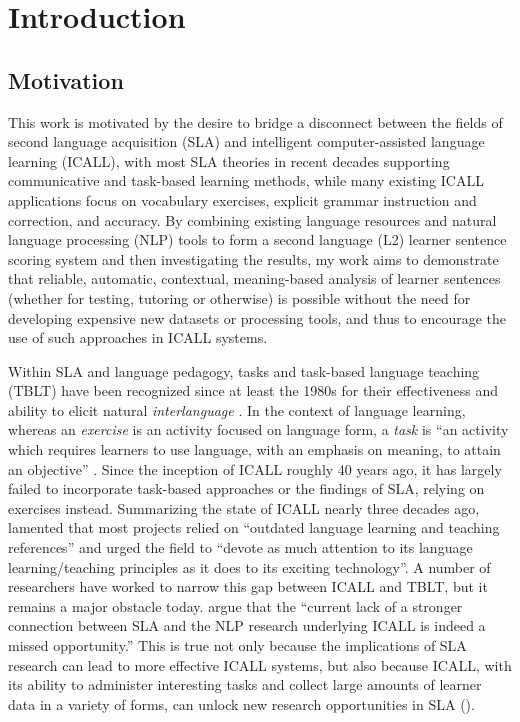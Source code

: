 \chapter{Introduction}
\label{chap:intro}

\section{Motivation}
\label{sec:motivation}


This work is motivated by the desire to bridge a disconnect between the fields of second language acquisition (SLA) and intelligent computer-assisted language learning (ICALL), with most SLA theories in recent decades supporting communicative and task-based learning methods, while many existing ICALL applications focus on vocabulary exercises, explicit grammar instruction and correction, and accuracy. By combining existing language resources and natural language processing (NLP) tools to form a second language (L2) learner sentence scoring system and then investigating the results, my work aims to demonstrate that reliable, automatic, contextual, meaning-based analysis of learner sentences (whether for testing, tutoring or otherwise) is possible without the need for developing expensive new datasets or processing tools, and thus to encourage the use of such approaches in ICALL systems. 

Within SLA and language pedagogy, tasks and task-based language teaching (TBLT) have been recognized since at least the 1980s for their effectiveness and ability to elicit natural \textit{interlanguage} \cite{ellis2003task}. In the context of language learning, whereas an \textit{exercise} is an activity focused on language form, a \textit{task} is ``an activity which requires learners to use language, with an emphasis on meaning, to attain an objective'' \cite{bygate2001researching}. Since the inception of ICALL roughly 40 years ago, it has largely failed to incorporate task-based approaches or the findings of SLA, relying on exercises instead. Summarizing the state of ICALL nearly three decades ago, \citet{oxford1993intelligent} lamented that most projects relied on ``outdated language learning and teaching references'' and urged the field to ``devote as much attention to its language learning/teaching principles as it does to its exciting technology''. A number of researchers have worked to narrow this gap between ICALL and TBLT, but it remains a major obstacle today. \citet{ziegler2017interdisciplinary} argue that the ``current lack of a stronger connection between SLA and the NLP research underlying ICALL is indeed a missed opportunity.'' This is true not only because the implications of SLA research can lead to more effective ICALL systems, but also because ICALL, with its ability to administer interesting tasks and collect large amounts of learner data in a variety of forms, can unlock new research opportunities in SLA (\citealp[cf.][]{MeurersDickinson2017}).

